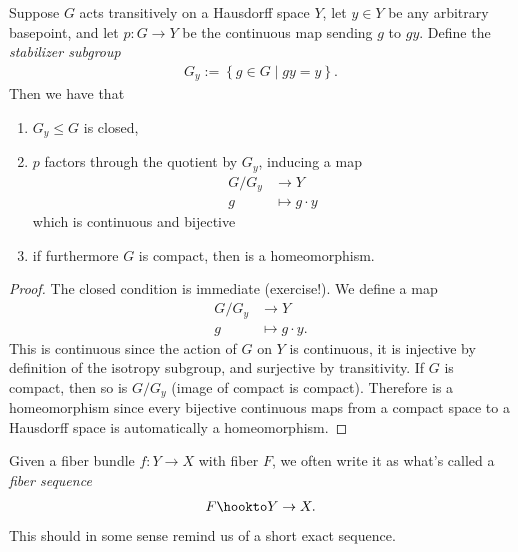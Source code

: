 \documentclass[11pt]{book}
\begin{document}
\begin{proposition}\label{prop:factor-space-via-group-action} 
Suppose $G$ acts transitively on a Hausdorff space $Y$, let $y\in Y$ be any arbitrary basepoint, and let $p \colon G \to Y$ be the continuous map sending $g$ to $gy$. Define the \emph{stabilizer subgroup}
\begin{align*}
    G_y := \left\{ g\in G \mid gy=y \right\}.
\end{align*}
Then we have that
\begin{enumerate}
    \item $G_y \le G$ is closed,
    \item $p$ factors through the quotient by $G_y$, inducing a map
    \begin{equation}\label{eqn:action-mod-isotropy-bijection}
    \begin{aligned}
        G/G_y &\to Y \\
        g &\mapsto g\cdot y
    \end{aligned}
    \end{equation}
    which is continuous and bijective
    \item if furthermore $G$ is compact, then  is a homeomorphism.
\end{enumerate}
\end{proposition}
\begin{proof}
The closed condition is immediate (exercise!). We define a map
\begin{align*}
    G/G_y &\to Y \\
    g &\mapsto g\cdot y.
\end{align*}
This is continuous since the action of $G$ on $Y$ is continuous, it is injective by definition of the isotropy subgroup, and surjective by transitivity. If $G$ is compact, then so is $G/G_y$ (image of compact is compact). Therefore  is a homeomorphism since every bijective continuous maps from a compact space to a Hausdorff space is automatically a homeomorphism.
\end{proof}


\begin{notation} Given a fiber bundle $f \colon Y\to X$ with fiber $F$, we often write it as what's called a \emph{fiber sequence}
\begin{align*}
    F \hookto Y \to X.
\end{align*}
This should in some sense remind us of a short exact sequence.
\end{notation}
\end{document}
